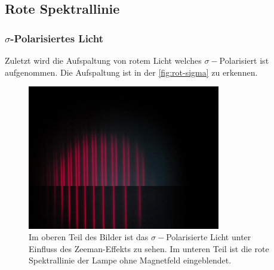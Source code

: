 \subsection{Rote Spektrallinie}
\subsubsection{\boldmath\texorpdfstring{$\sigma$}{sigma}-Polarisiertes Licht}
Zuletzt wird die Aufspaltung von rotem Licht welches $\sigma -$Polarisiert ist aufgenommen.
Die Aufspaltung ist in der \autoref{fig:rot-sigma} zu erkennen.

\begin{figure}
    \centering
    \includegraphics[width=0.75\textwidth]{content/data/Rot_0_sigma_uebernander.JPG}
    \caption{Im oberen Teil des Bilder ist das $\sigma -$Polarisierte Licht unter Einfluss des Zeeman-Effekts zu sehen. Im unteren Teil ist die rote Spektrallinie der Lampe ohne Magnetfeld eingeblendet.}
    \label{fig:rot-sigma}
\end{figure}

